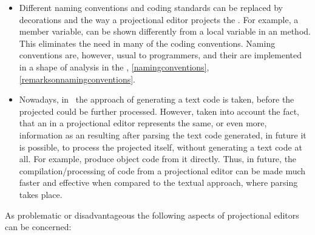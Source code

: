 \begin{itemize}
  \item Different naming conventions and coding standards can be replaced by decorations and the way a projectional editor
  projects the . For example, a member variable, can be shown differently from a local variable in an method. This 
  eliminates the need in many of the coding conventions. Naming conventions are, however, usual to programmers, and their are
  implemented in a shape of analysis in the \pcpp, \ref{namingconventions}, \ref{remarksonnamingconventions}.

  
  
  \item Nowadays, in \jbmps\ the approach of generating a text code is taken, before the projected  could be further processed.
  However, taken into account the fact, that an  in a projectional editor represents the same, or even more, information 
  as an  resulting after parsing the text code generated, in future it is possible, to process the projected  itself,
  without generating a text code at all. For example, produce object code from it directly. Thus, in future, the compilation/processing
  of code from a projectional editor can be made much faster and effective when compared to the textual approach, where parsing takes place.
 
 \end{itemize}
 
 
 As problematic or disadvantageous the following aspects of projectional editors can be concerned:
 
